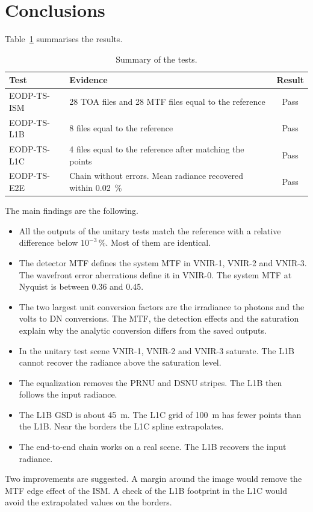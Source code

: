 \section{Conclusions}
\label{sec:conclusions}

Table~\ref{tab:summary} summarises the results.

\begin{table}[H]
\centering
\caption{Summary of the tests.}
\label{tab:summary}
\begin{tabular}{llc}
\toprule
Test & Evidence & Result \\
\midrule
EODP-TS-ISM & 28 TOA files and 28 MTF files equal to the reference & Pass \\
EODP-TS-L1B & 8 files equal to the reference & Pass \\
EODP-TS-L1C & 4 files equal to the reference after matching the points & Pass \\
EODP-TS-E2E & Chain without errors. Mean radiance recovered within 0.02~\% & Pass \\
\bottomrule
\end{tabular}
\end{table}

The main findings are the following.
\begin{itemize}
\item All the outputs of the unitary tests match the reference with a relative difference below $10^{-3}\,\%$. Most of them are identical.
\item The detector MTF defines the system MTF in VNIR-1, VNIR-2 and VNIR-3. The wavefront error aberrations define it in VNIR-0. The system MTF at Nyquist is between 0.36 and 0.45.
\item The two largest unit conversion factors are the irradiance to photons and the volts to DN conversions. The MTF, the detection effects and the saturation explain why the analytic conversion differs from the saved outputs.
\item In the unitary test scene VNIR-1, VNIR-2 and VNIR-3 saturate. The L1B cannot recover the radiance above the saturation level.
\item The equalization removes the PRNU and DSNU stripes. The L1B then follows the input radiance.
\item The L1B GSD is about 45~m. The L1C grid of 100~m has fewer points than the L1B. Near the borders the L1C spline extrapolates.
\item The end-to-end chain works on a real scene. The L1B recovers the input radiance.
\end{itemize}

Two improvements are suggested.
A margin around the image would remove the MTF edge effect of the ISM.
A check of the L1B footprint in the L1C would avoid the extrapolated values on the borders.
